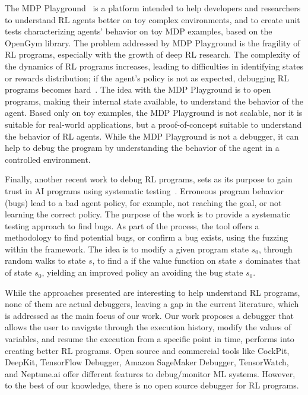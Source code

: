 The \ac{MDP} Playground~\cite{rajan23} is a platform intended to help 
developers and researchers to understand \ac{RL} agents better on toy complex environments, and 
to create unit tests characterizing agents' behavior  on toy \ac{MDP} examples, based on the 
OpenGym library. The problem addressed by \ac{MDP} Playground is the fragility of \ac{RL} 
programs, especially with the growth of deep \ac{RL} research. The complexity of the 
dynamics of \ac{RL} programs increases, leading to difficulties in identifying states or rewards 
distribution; if the agent's policy is not as expected, debugging \ac{RL} programs becomes 
hard~\cite{rajan23}. The idea with the \ac{MDP} Playground is to open programs, making their 
internal state available, to understand the behavior of the agent. Based only on toy examples, the
\ac{MDP} Playground is not scalable, nor it is suitable for real-world applications, but a 
proof-of-concept suitable to understand the behavior of \ac{RL} agents. While the \ac{MDP} 
Playground is not a debugger, it can help to debug the program by understanding the behavior of 
the agent in a controlled environment.

Finally, another recent work to debug \ac{RL} programs, sets as its purpose to gain trust in \ac{AI} 
programs using systematic testing~\cite{steinmetz21}. Erroneous program behavior (\ie bugs) lead to 
a bad agent policy, for example, not reaching the goal, or not learning the correct policy. The purpose 
of the work is to provide a systematic testing approach to find bugs. As part of the process, the tool 
offers a methodology to find potential bugs, or confirm a bug exists, using the fuzzing within the 
framework. 
The idea is to modify a given program state $s_0$, through random walks to state $s$, to find a if the 
value function on state $s$ dominates that of state $s_0$, yielding an improved policy an avoiding 
the bug state $s_0$. 

While the approaches presented are interesting to help understand \ac{RL} programs, none of them 
are actual debuggers, leaving a gap in the current literature, which is addressed as the main focus of 
our work. Our work proposes a debugger that allows the user to navigate through the execution 
history, modify the values of variables, and resume the execution from a specific point in time, 
performs into creating better \ac{RL} programs.
Open source and commercial tools like CockPit, DeepKit, TensorFlow Debugger, Amazon SageMaker 
Debugger,  TensorWatch, and Neptune.ai offer different features to debug/monitor ML systems. 
However, to the best of our knowledge, there is no open source debugger for
\ac{RL} programs. 


\endinput

 


